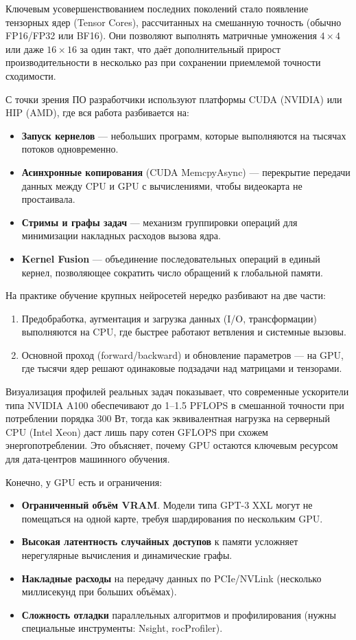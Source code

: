 Ключевым усовершенствованием последних поколений стало появление тензорных ядер (Tensor Cores), рассчитанных на смешанную точность (обычно FP16/FP32 или BF16). Они позволяют выполнять матричные умножения $4\times4$ или даже $16\times16$ за один такт, что даёт дополнительный прирост производительности в несколько раз при сохранении приемлемой точности сходимости.  

С точки зрения ПО разработчики используют платформы CUDA (NVIDIA) или HIP (AMD), где вся работа разбивается на:  
\begin{itemize}  
  \item \textbf{Запуск кернелов} — небольших программ, которые выполняются на тысячах потоков одновременно.  
  \item \textbf{Асинхронные копирования} (CUDA MemcpyAsync) — перекрытие передачи данных между CPU и GPU с вычислениями, чтобы видеокарта не простаивала.  
  \item \textbf{Стримы и графы задач} — механизм группировки операций для минимизации накладных расходов вызова ядра.  
  \item \textbf{Kernel Fusion} — объединение последовательных операций в единый кернел, позволяющее сократить число обращений к глобальной памяти.  
\end{itemize}  

На практике обучение крупных нейросетей нередко разбивают на две части:  
\begin{enumerate}  
  \item Предобработка, аугментация и загрузка данных (I/O, трансформации) выполняются на CPU, где быстрее работают ветвления и системные вызовы.  
  \item Основной проход (forward/backward) и обновление параметров — на GPU, где тысячи ядер решают одинаковые подзадачи над матрицами и тензорами.  
\end{enumerate}  

Визуализация профилей реальных задач показывает, что современные ускорители типа NVIDIA A100 обеспечивают до 1–1.5 PFLOPS в смешанной точности при потреблении порядка 300 Вт, тогда как эквивалентная нагрузка на серверный CPU (Intel Xeon) даст лишь пару сотен GFLOPS при схожем энергопотреблении. Это объясняет, почему GPU остаются ключевым ресурсом для дата-центров машинного обучения.  

Конечно, у GPU есть и ограничения:  
\begin{itemize}  
  \item \textbf{Ограниченный объём VRAM}. Модели типа GPT-3 XXL могут не помещаться на одной карте, требуя шардирования по нескольким GPU.  
  \item \textbf{Высокая латентность случайных доступов} к памяти усложняет нерегулярные вычисления и динамические графы.  
  \item \textbf{Накладные расходы} на передачу данных по PCIe/NVLink (несколько миллисекунд при больших объёмах).  
  \item \textbf{Сложность отладки} параллельных алгоритмов и профилирования (нужны специальные инструменты: Nsight, rocProfiler).  
\end{itemize}  

